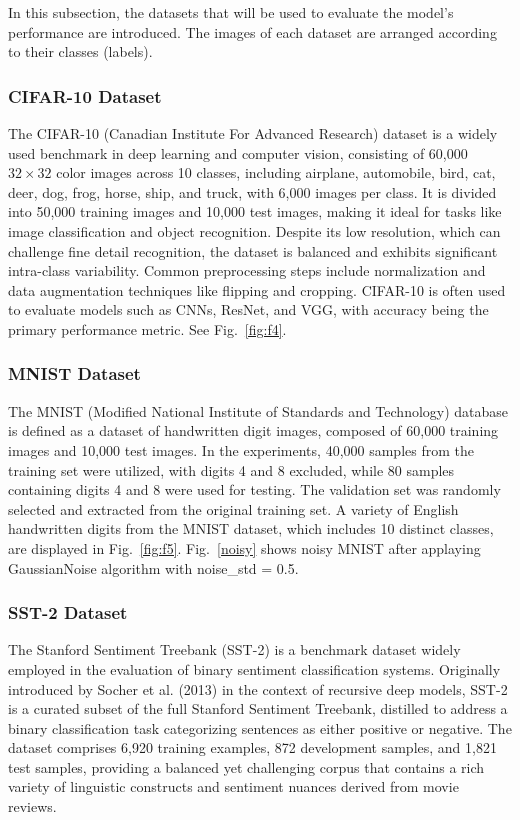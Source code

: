 \documentclass{article}
\begin{document}
In this subsection, the datasets that will be used to evaluate the model's performance are introduced. The images of each dataset are arranged according to their classes (labels). 


\subsubsection{ CIFAR-10 Dataset}

The CIFAR-10  (Canadian Institute For Advanced Research) dataset is a widely used benchmark in deep learning and computer vision, consisting of 60,000 $32\times 32$ color images across 10 classes, including airplane, automobile, bird, cat, deer, dog, frog, horse, ship, and truck, with 6,000 images per class. It is divided into 50,000 training images and 10,000 test images, making it ideal for tasks like image classification and object recognition. Despite its low resolution, which can challenge fine detail recognition, the dataset is balanced and exhibits significant intra-class variability. Common preprocessing steps include normalization and data augmentation techniques like flipping and cropping. CIFAR-10 is often used to evaluate models such as CNNs, ResNet, and VGG, with accuracy being the primary performance metric. See Fig.~\ref{fig:f4}.



\subsubsection{MNIST Dataset}

The MNIST (Modified National Institute of Standards and Technology) database is defined as a dataset of handwritten digit images, composed of 60,000 training images and 10,000 test images. In the experiments, 40,000 samples from the training set were utilized, with digits 4 and 8 excluded, while 80 samples containing digits 4 and 8 were used for testing. The validation set was randomly selected and extracted from the original training set. A variety of English handwritten digits from the MNIST dataset, which includes 10 distinct classes, are displayed in Fig.~\ref{fig:f5}. Fig.~\ref{noisy} shows noisy MNIST after applaying GaussianNoise algorithm with noise\_std = 0.5.



\subsubsection{SST-2 Dataset}
The Stanford Sentiment Treebank (SST-2) is a benchmark dataset widely employed in the evaluation of binary sentiment classification systems. Originally introduced by Socher et al. (2013) in the context of recursive deep models, SST-2 is a curated subset of the full Stanford Sentiment Treebank, distilled to address a binary classification task categorizing sentences as either positive or negative. The dataset comprises 6,920 training examples, 872 development samples, and 1,821 test samples, providing a balanced yet challenging corpus that contains a rich variety of linguistic constructs and sentiment nuances derived from movie reviews.
\end{document}
